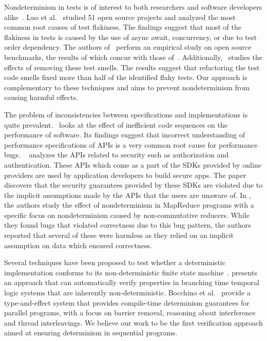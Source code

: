 Nondeterminism in tests is of interest to both
researchers and software developers alike~\cite{Fowler,Sudarshan}.
Luo et al.~\cite{LuoHEM2014} studied 51 open source projects and analyzed the most common root causes of
test flakiness. The findings suggest that most of the flakiness in tests is caused by
the use of async await, concurrency, or due to test order dependency. The authors of~\cite{Plotkin:1993:LPP:645891.671433}
perform an empirical study on open source benchmarks, the results of which concur with those of~\cite{LuoHEM2014}.
Additionally,~\cite{Plotkin:1993:LPP:645891.671433} studies the effects of removing these test smells. The results suggest that
refactoring the test code smells fixed more than half of the identified flaky tests. Our approach is complementary to
these techniques and aims to prevent nondeterminism from causing harmful effects. 


The problem of inconsistencies between specifications and implementations
is quite prevalent.~\cite{Jin:2012:UDR:2254064.2254075} looks at the effect of inefficient code sequences on the performance of software.
Its findings suggest that incorrect understanding of performance specifications of APIs is a very common root cause for
performance bugs. ~\cite{Rui:2013:180377} analyzes the APIs related to security such as authorization and authentication.
These APIs which come as a part of the SDKs provided by online providers are used by application developers to 
build secure apps. The paper discovers that the security guarantees provided by these SDKs are violated due to
the implicit assumptions made by the APIs that the users are unaware of. In \cite{Xiao:2014:NMC:2591062.2591177},
the authors
study the effect of nondeterminism in MapReduce programs with a specific focus on nondeterminism caused by
non-commutative reducers. While they found bugs that violated correctness due to this bug pattern,
the authors reported that several of these were harmless as they relied on an implicit assumption on data
which ensured correctness. 

Several techniques have been proposed to test whether a
deterministic implementation conforms to its non-deterministic finite state machine~\cite{Petrenko1996,Petrenko:1993:NSM:648128.761244,Savor:1997:639710,Hierons:2004:TCD:1040993.1040998}.
\cite{Cook:2013:RNP:2491956.2491969} presents an approach that can automatically verify properties
in branching time temporal logic systems that are inherently
non-deterministic.
Bocchino et
al.~\cite{Bocchino:2009:TES:1640089.1640097,Bocchino:2011:SND:1926385.1926447}
provide a type-and-effect system that provides compile-time determinism
guarantees for parallel programs, with a focus on barrier removal,
reasoning about interference and thread interleavings.
We believe our work to be the first verification approach
aimed at ensuring determinism in sequential programs.


